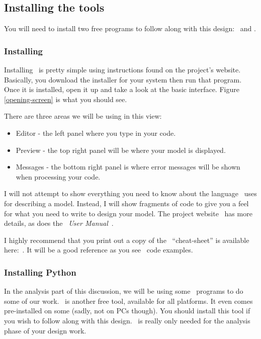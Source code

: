 \subsection{Installing the tools}

You will need to install two free programs to follow along with this design: \osc\ and \PY.

\subsubsection{Installing \osc}

Installing \osc\ is pretty simple using instructions found on the project's
website. Basically, you download the installer for your system then run that program. Once it is installed, open it up and take a look at the basic
interface.  Figure \ref{opening-screen} is what you should see.


There are three areas we will be using in this view:

\begin{itemize}
\item{Editor - the left panel where you type in your code.}
\item{Preview - the top right panel will be where your model is displayed.}
\item{Messages - the bottom right panel is where error messages will be shown
when processing your code.}
\end{itemize}

I will not attempt to show everything you need to know about the language \osc\
uses for describing a model. Instead, I will show fragments of code to give you
a feel for what you need to write to design your model. The project
website~\cite{blackr} has more details, as does the \osc\ {\it User
Manual}~\cite{userman}.

I highly recommend that you  print out a copy of the \osc\
``cheat-sheet'' is available here:~\cite{osccheat}. It will be a good reference
as you see \osc\ code examples.

\subsubsection{Installing Python}

In the analysis part of this discussion, we will be using some \PY\ programs to
do some of our work. \PY\ is another free tool, available for all platforms. It
even comes pre-installed on some (sadly, not on PCs though). You should install
this tool if you wish to follow along with this design. \PY\ is really only needed for the analysis phase of your design work.

